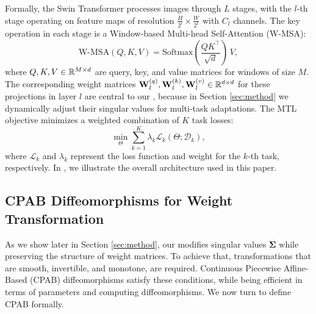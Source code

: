 Formally, the Swin Transformer processes images through $L$ stages, with the $l$-th stage operating on feature maps of resolution $\frac{H}{2^l} \times \frac{W}{2^l}$ with $C_l$ channels. The key operation in each stage is a Window-based Multi-head Self-Attention (W-MSA):
\begin{equation}
    \text{W-MSA}(Q, K, V) = \text{Softmax}\left(\frac{QK^\top}{\sqrt{d}}\right)\,V,
\end{equation}
where $Q, K, V \in {\mathbb{R}}^{M \times d}$ are query, key, and value matrices for windows of size $M$. The corresponding weight matrices ${\mathbf{W}}_l^{(q)}, {\mathbf{W}}_l^{(k)}, {\mathbf{W}}_l^{(v)} \in {\mathbb{R}}^{d \times d}$ for these projections in layer $l$ are central to our \ourmethod{}, because in Section \ref{sec:method} we dynamically adjust their singular values for multi-task adaptations. The MTL objective minimizes a weighted combination of $K$ task losses:
\begin{equation}
\label{eqn:mtlloss}
    \min_{\Theta} \sum\limits_{k=1}^K \lambda_k \mathcal{L}_k(\Theta; \mathcal{D}_k),
\end{equation}
where $\mathcal{L}_k$ and $\lambda_k$ represent the loss function and weight for the $k$-th task, respectively. In , we illustrate the overall architecture used in this paper.


\subsection{CPAB Diffeomorphisms for Weight Transformation}
\label{subsec:cpab}
As we show later in Section \ref{sec:method}, our \ourmethod{} modifies singular values $\mathbf{\Sigma}$ while preserving the structure of weight matrices. To achieve that, transformations that are smooth, invertible, and monotone, are required. Continuous Piecewise Affine-Based (CPAB) \cite{freifeld2015highly, freifeld2017transformations} diffeomorphisms satisfy these conditions, while being efficient in terms of parameters and computing diffeomorphisms. We now turn to define CPAB formally. 

